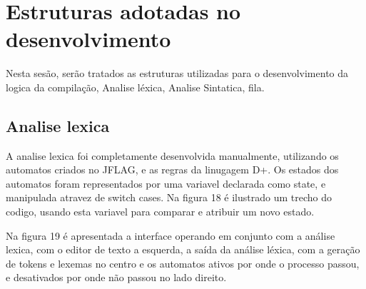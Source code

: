 \documentclass[12pt,oneside,a4paper,chapter=TITLE,section=TITLE,sumario=tradicional]{abntex2}
\begin{document}
\section{Estruturas adotadas no desenvolvimento}
\label{sec:estruturasadotadas}

Nesta sesão, serão tratados as estruturas utilizadas para o desenvolvimento da logica da compilação, Analise léxica, Analise Sintatica, fila.

\subsection{Analise lexica}
\label{subsec:analiselexica}

A analise lexica foi completamente desenvolvida manualmente, utilizando os automatos criados no JFLAG, e as regras da linugagem D+. Os estados dos automatos foram representados por uma variavel declarada como state, e manipulada atravez de switch cases.
Na figura 18 é ilustrado um trecho do codigo, usando esta variavel para comparar e atribuir um novo estado.

\begin{figure}[htb]
\end{figure} 

Na figura 19 é apresentada a interface operando em conjunto com a análise lexica, com o editor de texto a esquerda, a saída da análise léxica, com a geração de tokens e lexemas no centro e os automatos ativos por onde o processo passou, e desativados por onde não passou no lado direito.

\begin{figure}[htb]
\end{figure} 
\end{document}

